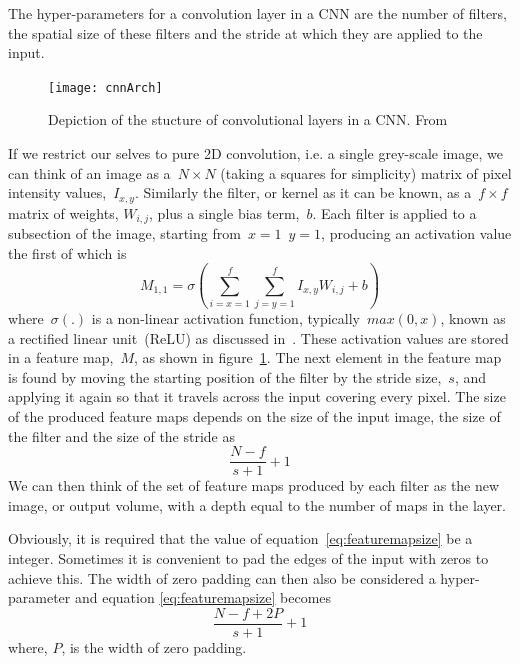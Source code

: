 \documentclass[11pt]{article} %
\begin{document}
The hyper-parameters for a convolution layer in a CNN are the number of filters, the spatial size of these filters and the stride at which they are applied to the input. %

\begin{figure}
\texttt{[image: cnnArch]}
\caption{Depiction of the stucture of convolutional layers in a CNN.  From~\cite{Ciresan2011}	\label{fig:convs}  } 
\end{figure}

If we restrict our selves to pure 2D convolution, i.e. a single grey-scale image, we can think of an image as a~$N\times N$ (taking a squares for simplicity) matrix of pixel intensity values,~$I_{x,y}$. Similarly the filter, or kernel as it can be known, as a~$f \times f$ matrix of weights, $W_{i,j}$, plus a single bias term,~$b$. Each filter is applied to a subsection of the image, starting from~$x=1$~$y=1$, producing an activation value the first of which is 
\begin{equation}
M_{1,1} = \sigma(\sum_{i=x=1}^{f}\sum_{j=y=1}^{f}I_{x,y} W_{i,j}+b)
\label{eq:filterMapActivation}
\end{equation}
where~$\sigma(.)$ is a non-linear activation function, typically~$max(0,x)$, known as a rectified linear unit~(ReLU) as discussed in~\cite{Krizhevsky2012}. These activation values are stored in a feature map,~$M$, as shown in figure~\ref{fig:convs}. The next element in the feature map is found by moving the starting position of the filter by the stride size,~$s$, and applying it again so that it travels across the input covering every pixel. The size of the produced feature maps depends on the size of the input image, the size of the filter and the size of the stride as 
\begin{equation}
\frac{N-f}{s+1}+1
\label{eq:featuremapsize}
\end{equation}
We can then think of the set of feature maps produced by each filter as the new image, or output volume, with a depth equal to the number of maps in the layer. 

Obviously, it is required that the value of equation~\ref{eq:featuremapsize} be a integer. Sometimes it is convenient to pad the edges of the input with zeros to achieve this. The width of zero padding can then also be considered a hyper-parameter and equation \ref{eq:featuremapsize} becomes 
\begin{equation}
\frac{N-f+2P}{s+1}+1
\label{eq:featuremapsizePadded}
\end{equation}
where, $P$, is the width of zero padding.
\end{document}
